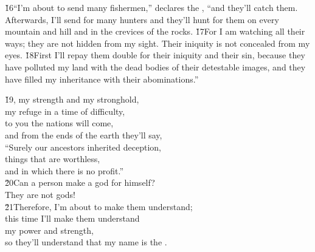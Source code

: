 \v{16}``I'm about to send many fishermen,'' declares the , ``and they'll catch them. Afterwards, I'll send for many hunters and they'll hunt for them on every mountain and hill and in the crevices of the rocks. \v{17}For I am watching all their ways; they are not hidden from my sight. Their iniquity is not concealed from my eyes. \v{18}First I'll repay them double for their iniquity and their sin, because they have polluted my land with the dead bodies of their detestable images, and they have filled my inheritance with their abominations.''

\begin{poetry}
\poeml \v{19}, my strength and my stronghold, \\
\poemll    my refuge in a time of difficulty, \\
\poeml to you the nations will come, \\
\poemll    and from the ends of the earth they'll say, \\
\poeml ``Surely our ancestors inherited deception, \\
\poemll    things that are worthless, \\
\poemlll       and in which there is no profit.'' \\
\poeml \v{20}Can a person make a god for himself? \\
\poemll    They are not gods! \\
\poeml \v{21}Therefore, I'm about to make them understand; \\
\poemll    this time I'll make them understand \\
\poeml my power and strength, \\
\poemll    so they'll understand that my name is the .
\end{poetry}

